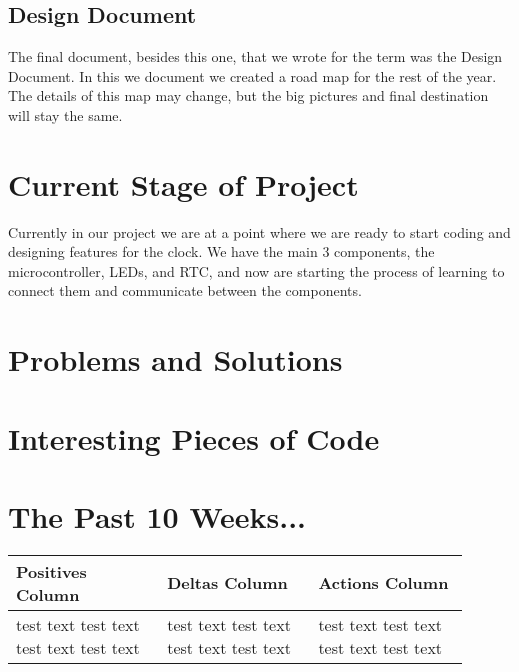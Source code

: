 \documentclass[10pt,draftclsnofoot,onecolumn]{IEEEtran}
\begin{document}
\subsection{Design Document}
The final document, besides this one, that we wrote for the term was the Design Document.
In this we document we created a road map for the rest of the year. 
The details of this map may change, but the big pictures and final destination will stay the same.

\section{Current Stage of Project}
Currently in our project we are at a point where we are ready to start coding and designing features for the clock.
We have the main 3 components, the microcontroller, LEDs, and RTC, and now are starting the process of learning to connect them and communicate between the components.

\section{Problems and Solutions}

\section{Interesting Pieces of Code}

\section{The Past 10 Weeks...}
\begin{center}
\begin{tabular}{| p{0.3\linewidth} | p{0.3\linewidth} | p{0.3\linewidth} |}
\hline
Positives Column & 
Deltas Column & 
Actions Column \\
\hline
test text test text test text test text &
test text test text test text test text &
test text test text test text test text \\
\hline
\end{tabular}
\end{center}
\end{document}

